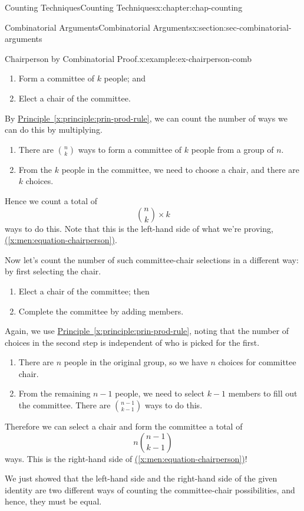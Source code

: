 \documentclass[oneside,10pt,]{book}
\newcommand{\xreffont}{\relax}
\numberwithin{equation}{section}
\begin{document}
\begin{chapterptx}{Counting Techniques}{}{Counting Techniques}{}{}{x:chapter:chap-counting}
\begin{sectionptx}{Combinatorial Arguments}{}{Combinatorial Arguments}{}{}{x:section:sec-combinatorial-arguments}
\begin{example}{Chairperson by Combinatorial Proof.}{x:example:ex-chairperson-comb}
\begin{enumerate}
\item{}Form a committee of \(k\) people; and%
\item{}Elect a chair of the committee.%
\end{enumerate}
By \hyperref[x:principle:prin-prod-rule]{Principle~{\xreffont\ref{x:principle:prin-prod-rule}}}, we can count the number of ways we can do this by multiplying.%
\begin{enumerate}
\item{}There are \(\binom{n}{k}\) ways to form a committee of \(k\) people from a group of \(n\).%
\item{}From the \(k\) people in the committee, we need to choose a chair, and there are \(k\) choices.%
\end{enumerate}
Hence we count a total of%
\begin{equation*}
\binom{n}{k} \times k
\end{equation*}
ways to do this. Note that this is the left-hand side of what we're proving, \hyperref[x:men:equation-chairperson]{({\xreffont\ref{x:men:equation-chairperson}})}.%
\par
Now let's count the number of such committee-chair selections in a different way: by first selecting the chair.%
\begin{enumerate}
\item{}Elect a chair of the committee; then%
\item{}Complete the committee by adding members.%
\end{enumerate}
Again, we use \hyperref[x:principle:prin-prod-rule]{Principle~{\xreffont\ref{x:principle:prin-prod-rule}}}, noting that the number of choices in the second step is independent of who is picked for the first.%
\begin{enumerate}
\item{}There are \(n\) people in the original group, so we have \(n\) choices for committee chair.%
\item{}From the remaining \(n-1\) people, we need to select \(k-1\) members to fill out the committee. There are \(\binom{n-1}{k-1}\) ways to do this.%
\end{enumerate}
Therefore we can select a chair and form the committee a total of%
\begin{equation*}
n\binom{n-1}{k-1}
\end{equation*}
ways. This is the right-hand side of \hyperref[x:men:equation-chairperson]{({\xreffont\ref{x:men:equation-chairperson}})}!%
\par
We just showed that the left-hand side and the right-hand side of the given identity are two different ways of counting the committee-chair possibilities, and hence, they must be equal.%

\end{example}
\end{sectionptx}
\end{chapterptx}
\end{document}
